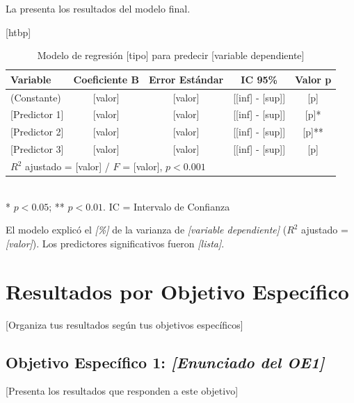 La  presenta los resultados del modelo final.

\begin{table}{[htbp]}
    \centering
    \caption{Modelo de regresión {[tipo]} para predecir {[variable dependiente]}}
    \label{tab:regresion}
    \begin{tabular}{@{}lcccc@{}}
        \toprule
        \textbf{Variable} & \textbf{Coeficiente B} & \textbf{Error Estándar} & \textbf{IC 95\%} & \textbf{Valor p} \\
        \midrule
        (Constante) & {[valor]} & {[valor]} & {[[inf]} - {[sup]}] & {[p]} \\
        {[Predictor 1]} & {[valor]} & {[valor]} & {[[inf]} - {[sup]}] & {[p]}* \\
        {[Predictor 2]} & {[valor]} & {[valor]} & {[[inf]} - {[sup]}] & {[p]}** \\
        {[Predictor 3]} & {[valor]} & {[valor]} & {[[inf]} - {[sup]}] & {[p]} \\
        \midrule
        \multicolumn{5}{l}{$R^2$ ajustado = {[valor]} / $F$ = {[valor]}, $p < 0.001$} \\
        \bottomrule
    \end{tabular}
    \\[5pt]
    \footnotesize{* $p < 0.05$; ** $p < 0.01$. IC = Intervalo de Confianza}
\end{table}

El modelo explicó el \textit{[\%]} de la varianza de \textit{{[variable dependiente]}} ($R^2$ ajustado = \textit{{[valor]}}). Los predictores significativos fueron \textit{{[lista]}}.

\section{Resultados por Objetivo Específico}
\label{sec:resultados_por_objetivo}

{[Organiza tus resultados según tus objetivos específicos]}

\subsection{Objetivo Específico 1: \textit{{[Enunciado del OE1]}}}
\label{subsec:resultados_oe1}

{[Presenta los resultados que responden a este objetivo]}

